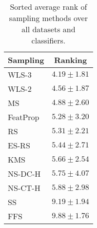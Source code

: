 \begin{table}
\centering
\caption{Sorted average rank of sampling methods over all datasets and classifiers.}
\begin{tabular}{|l|c|}
\hline
 \textbf{Sampling} &  \textbf{Ranking} \\
\hline \hline
    WLS-3 &       $4.19 \pm 1.81$ \\ \hline
    WLS-2 &       $4.56 \pm 1.87$ \\ \hline
       MS &       $4.88 \pm 2.60$ \\ \hline
 FeatProp &       $5.28 \pm 3.20$ \\ \hline
       RS &       $5.31 \pm 2.21$ \\ \hline
    ES-RS &       $5.44 \pm 2.71$ \\ \hline
      KMS &       $5.66 \pm 2.54$ \\ \hline
  NS-DC-H &       $5.75 \pm 4.07$ \\ \hline
  NS-CT-H &       $5.88 \pm 2.98$ \\ \hline
       SS &       $9.19 \pm 1.94$ \\ \hline
      FFS &       $9.88 \pm 1.76$ \\ \hline
\end{tabular}
\label{table:rank}
\end{table}
